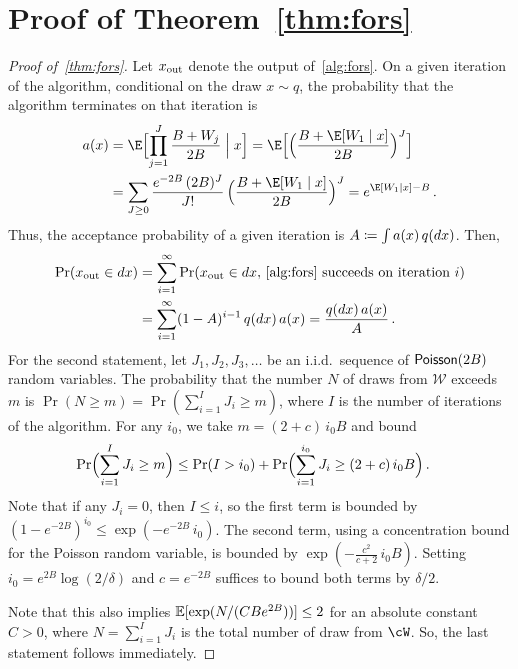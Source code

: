 \section{Proof of Theorem~\ref{thm:fors}}


\begin{proof}[Proof of~\cref{thm:fors}]
    Let $x_{\rm out}$ denote the output of~\cref{alg:fors}.
    On a given iteration of the algorithm, conditional on the draw $x\sim q$, the probability that the algorithm terminates on that iteration is
    \begin{align*}
        a(x)
        &= \E\Bigl[\prod_{j=1}^J \frac{B+W_j}{2B}\Bigm\vert x\Bigr]
        =\E\Bigl[\Bigl(\frac{B+\E[W_1\mid x]}{2B}\Bigr)^J\Bigr]\\
        &= \sum_{J\geq 0} \frac{e^{-2B}\,(2B)^J}{J!} \,\Bigl(\frac{B+\E[W_1\mid x]}{2B}\Bigr)^J
        = e^{\E[W_1\mid x]-B}\,.
    \end{align*}
    Thus, the acceptance probability of a given iteration is $A \deq \int a(x)\,q(dx)$.
    Then,
    \begin{align*}
        \Pr(x_{\rm out} \in dx)
        &= \sum_{i=1}^\infty \Pr(x_{\rm out} \in dx, \, \text{\cref{alg:fors} succeeds on iteration}~i) \\
        &= \sum_{i=1}^\infty (1-A)^{i-1}\,q(dx)\,a(x)
        = \frac{q(dx)\,a(x)}{A}\,.
    \end{align*}
    For the second statement, let $J_1,J_2,J_3,\dotsc$ be an i.i.d.\ sequence of $\Poi(2B)$ random variables.
    The probability that the number $N$ of draws from $\mathcal W$ exceeds $m$ is $\Pr(N\geq m)=\Pr(\sum_{i=1}^I J_i \ge m)$, where $I$ is the number of iterations of the algorithm.
    For any $i_0$, we take $m = (2+c)\,i_0 B$ and bound
    \begin{align*}
        \Pr\Bigl(\sum_{i=1}^I J_i \ge m\Bigr)
        &\le \Pr(I > i_0) + \Pr\Bigl(\sum_{i=1}^{i_0} J_i \ge (2+c)\,i_0 B\Bigr)\,.
    \end{align*}
    Note that if any $J_i = 0$, then $I \le i$, so the first term is bounded by $(1-e^{-2B})^{i_0} \le \exp(-e^{-2B}\,i_0)$.
    The second term, using a concentration bound for the Poisson random variable, is bounded by $\exp(-\frac{c^2}{c+2}\,i_0 B)$.
    Setting $i_0 = e^{2B} \log(2/\delta)$ and $c=e^{-2B}$ suffices to bound both terms by $\delta/2$.

    Note that this also implies $\En[\exp\prn{N/(CBe^{2B})}]\leq 2$ for an absolute constant $C>0$, where $N=\sum_{i=1}^I J_i$ is the total number of draw from $\cW$.
    So, the last statement follows immediately.
\end{proof}
